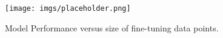 \begin{figure}[!t] 
 \centering
 \texttt{[image: imgs/placeholder.png]}
 \caption{Model Performance versus size of fine-tuning data points.}
\label{fig:fintune}
\end{figure}

